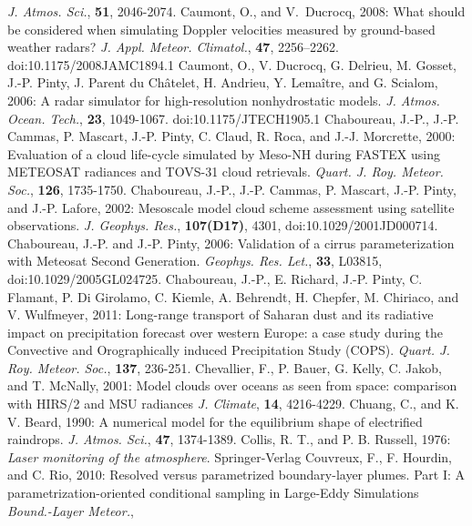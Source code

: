       {\it J. Atmos. Sci.},
      {\bf 51},
      2046-2074.
\decrefname
Caumont, O., and V.~Ducrocq, 2008: What should be considered when simulating
  {Doppler} velocities measured by ground-based weather radars\string? {\em J.
  Appl. Meteor. Climatol.}, {\bf 47}, 2256--2262. doi:10.1175/2008JAMC1894.1
\decrefname
Caumont, O., V. Ducrocq, G. Delrieu, M. Gosset, J.-P. Pinty, J. Parent du Ch\^atelet, 
      H. Andrieu, Y. Lema\^itre, and G. Scialom, 2006:
      A radar simulator for high-resolution nonhydrostatic models.
      {\it J. Atmos. Ocean. Tech.},
      {\bf 23},
      1049-1067. doi:10.1175/JTECH1905.1
\decrefname
Chaboureau, J.-P., J.-P. Cammas, P. Mascart, J.-P. Pinty, C. Claud, R. Roca, 
and J.-J. Morcrette, 2000: Evaluation of a cloud life-cycle simulated by
Meso-NH during FASTEX using METEOSAT radiances and TOVS-31 cloud retrievals.
      {\it Quart. J. Roy. Meteor. Soc.}, 
      {\bf 126},
      1735-1750.
\decrefname
Chaboureau, J.-P., J.-P. Cammas, P. Mascart, J.-P. Pinty, and J.-P. Lafore, 2002: Mesoscale model cloud scheme assessment using satellite observations.
      {\it J. Geophys. Res.}, 
      {\bf 107(D17)},
      4301, doi:10.1029/2001JD000714.
\decrefname
Chaboureau, J.-P. and J.-P. Pinty, 2006:
      Validation of a cirrus parameterization with Meteosat Second Generation.
      {\it Geophys. Res. Let.}, {\bf 33}, L03815, doi:10.1029/2005GL024725.
\decrefname
Chaboureau, J.-P., E. Richard, J.-P. Pinty, C. Flamant, P. Di Girolamo, C. Kiemle, A. Behrendt,
      H. Chepfer, M. Chiriaco, and V. Wulfmeyer, 2011:
      Long-range transport of Saharan dust and its radiative impact on precipitation forecast
      over western Europe: a case study during the Convective and Orographically induced
      Precipitation Study (COPS).
      {\it Quart. J. Roy. Meteor. Soc.}, 
      {\bf 137},
      236-251.
\decrefname
Chevallier, F., P. Bauer, G. Kelly, C. Jakob, and T. McNally, 2001:
      Model clouds over oceans as seen from space:
      comparison with HIRS/2 and MSU radiances
      {\it J. Climate}, 
      {\bf 14},
      4216-4229.
\decrefname
Chuang, C., and K. V. Beard, 1990:
      A numerical model for the equilibrium shape of electrified raindrops.
      {\it J. Atmos. Sci.},
      {\bf 47},
      1374-1389.
\decrefname
Collis, R. T., and P. B. Russell, 1976: \textit{Laser monitoring of the atmosphere}.
  Springer-Verlag
\decrefname
Couvreux, F., F. Hourdin, and C. Rio, 2010:
      Resolved versus parametrized boundary-layer plumes. Part I: A parametrization-oriented
      conditional sampling in Large-Eddy Simulations
      {\it Bound.-Layer Meteor.},
